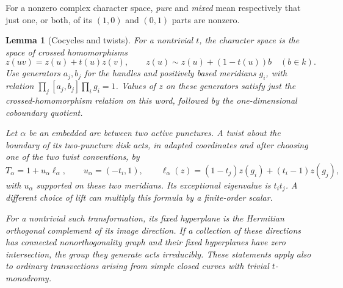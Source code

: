 \documentclass[11pt]{article}
\theoremstyle{plain}
\newtheorem{lemma}[theorem]{Lemma}
\theoremstyle{definition}
\theoremstyle{remark}
\numberwithin{equation}{section}
\begin{document}
For a nonzero complex character space, \emph{pure} and \emph{mixed}
mean respectively that just one, or both, of its $(1,0)$ and
$(0,1)$ parts are nonzero.

\begin{lemma}[Cocycles and twists]\label{p4:twist-model}
For a nontrivial $t$, the character space is the space of crossed
homomorphisms
\begin{equation}\label{p4:cocycles}
 z(uv)=z(u)+t(u)z(v),
 \qquad z(u)\sim z(u)+(1-t(u))b\quad(b\in k).
\end{equation}
Use generators $a_j,b_j$ for the handles and positively based meridians
$g_i$, with relation $\prod_j[a_j,b_j]\prod_i g_i=1$.  Values of $z$ on
these generators satisfy just the crossed-homomorphism relation on this
word, followed by the one-dimensional coboundary quotient.

Let $\alpha$ be an embedded arc between two active punctures.  A twist
about the boundary of its two-puncture disk acts, in adapted coordinates
and after choosing one of the two twist conventions, by
\begin{equation}\label{p4:pair-twist}
 T_\alpha=1+u_\alpha\ell_\alpha,\qquad
 u_\alpha=(-t_i,1),\qquad
 \ell_\alpha(z)=(1-t_j)z(g_i)+(t_i-1)z(g_j),
\end{equation}
with $u_\alpha$ supported on these two meridians.  Its exceptional
eigenvalue is $t_it_j$.  A different choice of lift can multiply this
formula by a finite-order scalar.

For a nontrivial such transformation, its fixed hyperplane is the
Hermitian orthogonal complement of its image direction.  If a collection
of these directions has connected nonorthogonality graph and their fixed
hyperplanes have zero intersection, the group they generate acts
irreducibly.  These statements apply also to ordinary transvections
arising from simple closed curves with trivial $t$-monodromy.
\end{lemma}
\end{document}

